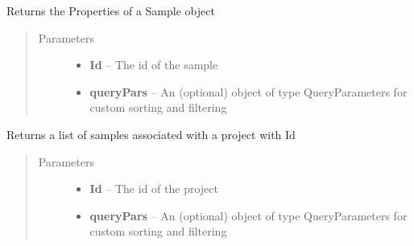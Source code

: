 \documentclass[letterpaper,10pt,english]{sphinxmanual}
\begin{document}
\begin{fulllineitems}
\begin{fulllineitems}
\end{fulllineitems}


\begin{fulllineitems}
\label{Available modules:BaseSpacePy.api.BaseSpaceAPI.BaseSpaceAPI.getSamplePropertiesById}
Returns the Properties of a Sample object
\begin{quote}\begin{description}
\item[{Parameters}] \leavevmode\begin{itemize}
\item {} 
\textbf{Id} -- The id of the sample

\item {} 
\textbf{queryPars} -- An (optional) object of type QueryParameters for custom sorting and filtering

\end{itemize}

\end{description}\end{quote}

\end{fulllineitems}


\begin{fulllineitems}
\label{Available modules:BaseSpacePy.api.BaseSpaceAPI.BaseSpaceAPI.getSamplesByProject}
Returns a list of samples associated with a project with Id
\begin{quote}\begin{description}
\item[{Parameters}] \leavevmode\begin{itemize}
\item {} 
\textbf{Id} -- The id of the project

\item {} 
\textbf{queryPars} -- An (optional) object of type QueryParameters for custom sorting and filtering

\end{itemize}

\end{description}\end{quote}


\end{fulllineitems}
\end{fulllineitems}
\end{document}
